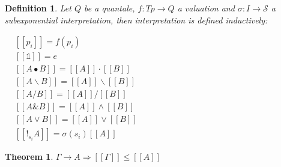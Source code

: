 \documentclass[a4paper]{article}
\newtheorem{theorem}{Theorem}
\newtheorem{defin}{Definition}
\begin{document}
\begin{defin} Let $Q$ be a quantale, $f : Tp \to Q$ a valuation and $\sigma : I \to \mathcal{S}$ a subexponential interpretation, then
  interpretation is defined inductively:

\begin{center}
$\begin{array}{lll}
& [\![p_i]\!] = f(p_i)&\\
& [\![\mathds{1}]\!] = e & \\
&[\![A \bullet B]\!] = [\![A]\!] \cdot [\![B]\!] & \\
&[\![A \backslash B]\!] = [\![A]\!] \backslash [\![B]\!] & \\
&[\![A / B]\!] = [\![A]\!] / [\![B]\!]& \\
&[\![A \& B]\!] = [\![A]\!] \wedge [\![B]\!]& \\
&[\![A \vee B]\!] = [\![A]\!] \vee [\![B]\!]& \\
&[\![!_{s_i} A]\!] = \sigma(s_i) [\![A]\!]&
\end{array}$
\end{center}
\end{defin}

\begin{theorem}
  $\Gamma \rightarrow A \Rightarrow [\![\Gamma]\!] \leq [\![A]\!]$
\end{theorem}
\end{document}
